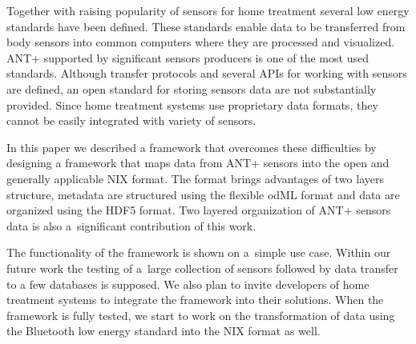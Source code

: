 \documentclass[conference]{IEEEtran}
\begin{document}
Together with raising popularity of sensors for home treatment several low energy standards have been defined. These standards enable data to be transferred from body sensors into common computers where they are processed and visualized. ANT+ supported by significant sensors producers is one of the most used standards. Although transfer protocols and several APIs for working with sensors are defined, an open standard for storing sensors data are not substantially provided. Since home treatment systems use proprietary data formats, they cannot be easily integrated with variety of sensors. 

In this paper we described a framework that overcomes these difficulties by designing a framework that maps data from ANT+ sensors into the open and generally applicable NIX format. The format brings advantages of two layers structure, metadata are structured using the flexible odML format and data are organized using the HDF5 format. Two layered organization of ANT+ sensors data is also a~significant contribution of this work.

The functionality of the framework is shown on a~simple use case. Within our future work the testing of a~large collection of sensors followed by data transfer to a few databases is supposed. We also plan to invite developers of home treatment systems to integrate the framework into their solutions. When the framework is fully tested, we start to work on the transformation of data using the Bluetooth low energy standard into the NIX format as well.




\end{document}
